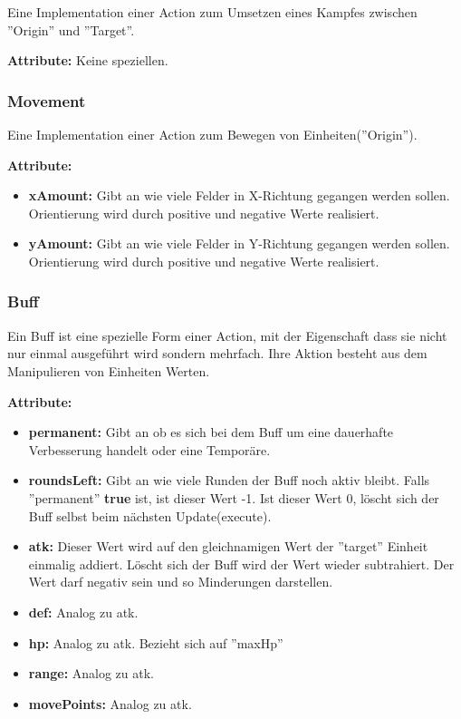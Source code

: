 \documentclass[fontsize=12pt,paper=a4,twoside]{scrartcl}
\begin{document}
Eine Implementation einer Action zum Umsetzen eines Kampfes zwischen ''Origin'' und ''Target''.

\textbf{Attribute:}
Keine speziellen.

\subsubsection{Movement}

Eine Implementation einer Action zum Bewegen von Einheiten(''Origin'').

\textbf{Attribute:}
\begin{itemize}
\item \textbf{xAmount:} Gibt an wie viele Felder in X-Richtung gegangen werden sollen. Orientierung wird durch positive und negative Werte realisiert.
\item \textbf{yAmount:} Gibt an wie viele Felder in Y-Richtung gegangen werden sollen. Orientierung wird durch positive und negative Werte realisiert.
\end{itemize}

\subsubsection{Buff}

Ein Buff ist eine spezielle Form einer Action, mit der Eigenschaft dass sie nicht nur einmal ausgeführt wird sondern mehrfach. Ihre Aktion besteht aus dem Manipulieren von Einheiten Werten.

\textbf{Attribute:}
\begin{itemize}
\item \textbf{permanent:} Gibt an ob es sich bei dem Buff um eine dauerhafte Verbesserung handelt oder eine Temporäre.
\item \textbf{roundsLeft:} Gibt an wie viele Runden der Buff noch aktiv bleibt. Falls ''permanent'' \textbf{true} ist, ist dieser Wert -1. Ist dieser Wert 0, löscht sich der Buff selbst beim nächsten Update(execute).
\item \textbf{atk:} Dieser Wert wird auf den gleichnamigen Wert der ''target'' Einheit einmalig addiert. Löscht sich der Buff wird der Wert wieder subtrahiert. Der Wert darf negativ sein und so Minderungen darstellen.
\item \textbf{def:} Analog zu atk.
\item \textbf{hp:} Analog zu atk. Bezieht sich auf ''maxHp''
\item \textbf{range:} Analog zu atk.
\item \textbf{movePoints:} Analog zu atk.
\end{itemize}
\end{document}
